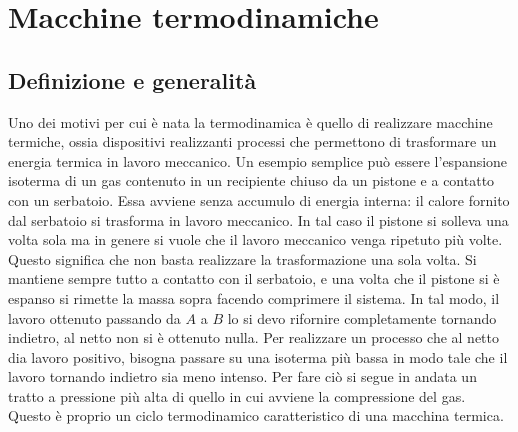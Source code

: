 \documentclass[10pt,a4paper]{book}
\begin{document}
\section{Macchine termodinamiche}

\subsection{Definizione e generalità}

Uno dei motivi per cui è nata la termodinamica è quello di realizzare macchine termiche, ossia dispositivi realizzanti processi che permettono di trasformare un energia termica in lavoro meccanico. Un esempio semplice può essere l'espansione isoterma di un gas contenuto in un recipiente chiuso da un pistone e a contatto con un serbatoio. Essa avviene senza accumulo di energia interna: il calore fornito dal serbatoio si trasforma in lavoro meccanico. In tal caso il pistone si solleva una volta sola ma in genere si vuole che il lavoro meccanico venga ripetuto più volte. Questo significa che non basta realizzare la trasformazione una sola volta. Si mantiene sempre tutto a contatto con il serbatoio, e una volta che il pistone si è espanso si rimette la massa sopra facendo comprimere il sistema. In tal modo, il lavoro ottenuto passando da $A$ a $B$ lo si devo rifornire completamente tornando indietro, al netto non si è ottenuto nulla. Per realizzare un processo che al netto dia lavoro positivo, bisogna passare su una isoterma più bassa in modo tale che il lavoro tornando indietro sia meno intenso. Per fare ciò si segue in andata un tratto a pressione più alta di quello in cui avviene la compressione del gas. Questo è proprio un ciclo termodinamico caratteristico di una macchina termica.
\end{document}
